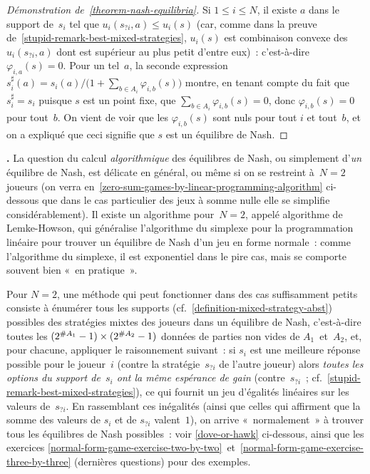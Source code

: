 \documentclass[12pt,a4paper]{article}
\theoremstyle{definition}
\newcommand\thingy{%
\refstepcounter{comcnt}\smallskip\noindent\textbf{\thecomcnt.} }
\begin{document}
\begin{proof}[Démonstration de \ref{theorem-nash-equilibria}]
Si $1\leq i\leq N$, il existe $a$ dans le support de $s_i$
tel que $u_i(s_{?i},a) \leq u_i(s)$ (car, comme dans la preuve
de \ref{stupid-remark-best-mixed-strategies}, $u_i(s)$ est combinaison
convexe des $u_i(s_{?i},a)$ dont est supérieur au plus petit d'entre
eux) : c'est-à-dire $\varphi_{i,a}(s) = 0$.  Pour un tel $a$, la
seconde expression $s^\sharp_i(a) = s_i(a) / \big(1 + \sum_{b\in
  A_i}\varphi_{i,b}(s)\big)$ montre, en tenant compte du fait que
$s^\sharp_i = s_i$ puisque $s$ est un point fixe, que $\sum_{b\in A_i}
\varphi_{i,b}(s) = 0$, donc $\varphi_{i,b}(s) = 0$ pour tout $b$.  On
vient de voir que les $\varphi_{i,b}(s)$ sont nuls pour tout $i$ et
tout $b$, et on a expliqué que ceci signifie que $s$ est un équilibre
de Nash.
\end{proof}

\thingy La question du calcul \emph{algorithmique} des équilibres de
Nash, ou simplement d'\emph{un} équilibre de Nash, est délicate en
général, ou même si on se restreint à $N=2$ joueurs (on verra
en \ref{zero-sum-games-by-linear-programming-algorithm} ci-dessous que
dans le cas particulier des jeux à somme nulle elle se simplifie
considérablement).  Il existe un algorithme pour $N=2$, appelé
algorithme de Lemke-Howson, qui
généralise l'algorithme du simplexe pour la programmation linéaire
pour trouver un équilibre de Nash d'un jeu en forme normale : comme
l'algorithme du simplexe, il est exponentiel dans le pire cas, mais se
comporte souvent bien « en pratique ».

Pour $N=2$, une méthode qui peut fonctionner dans des cas suffisamment
petits consiste à énumérer tous les supports
(cf. \ref{definition-mixed-strategy-abst}) possibles des stratégies
mixtes des joueurs dans un équilibre de Nash, c'est-à-dire toutes les
$(2^{\#A_1}-1)\penalty0\times\penalty0(2^{\#A_2}-1)$ données de
parties non vides de $A_1$ et $A_2$, et, pour chacune, appliquer le
raisonnement suivant : si $s_i$ est une meilleure réponse possible
pour le joueur $i$ (contre la stratégie $s_{?i}$ de l'autre joueur)
alors \emph{toutes les options du support de $s_i$ ont la même
  espérance de gain} (contre $s_{?i}$ ;
cf. \ref{stupid-remark-best-mixed-strategies}), ce qui fournit un jeu
d'égalités linéaires sur les valeurs de $s_{?i}$.  En rassemblant ces
inégalités (ainsi que celles qui affirment que la somme des valeurs de
$s_i$ et de $s_{?i}$ valent $1$), on arrive « normalement » à trouver
tous les équilibres de Nash possibles : voir \ref{dove-or-hawk}
ci-dessous, ainsi que les exercices
\ref{normal-form-game-exercise-two-by-two} et \ref{normal-form-game-exercise-three-by-three}
(dernières questions) pour des exemples.
\end{document}
